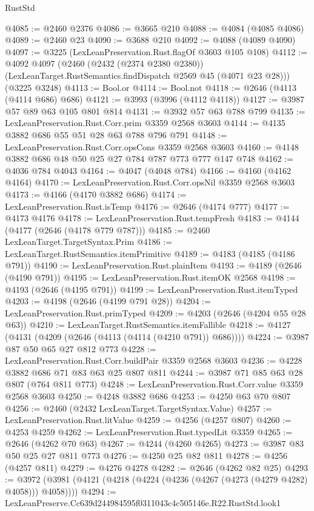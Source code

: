 \begin{lexlean}{RustStd}
\begin{coremodule}
@4085 := @2460 @2376
@4086 := @3665 @210
@4088 := @4084 (@4085 @4086)
@4089 := @2460 @23
@4090 := @3688 @210
@4092 := @4088 (@4089 @4090)
@4097 := @3225 (LexLeanPreservation.Rust.flagOf @3603 @105 @108)
@4112 := @4092
    @4097
    (@2460
      (@2432 (@2374 @2380 @2380))
      (LexLeanTarget.RustSemantics.findDispatch @2569 @45 (@4071 @23 @28)))
    (@3225 @3248)
@4113 := Bool.or
@4114 := Bool.not
@4118 := @2646 (@4113 (@4114 @686) @686)
@4121 := @3993 (@3996 (@4112 @4118))
@4127 := @3987 @57 @89 @63 @105 @801 @814
@4131 := @3932 @57 @63 @788 @799
@4135 := LexLeanPreservation.Rust.Corr.prim @3359 @2568 @3603
@4144 := @4135 @3882 @686 @55 @51 @28 @63 @788 @796 @791
@4148 := LexLeanPreservation.Rust.Corr.opsCons @3359 @2568 @3603
@4160 := @4148 @3882 @686 @48 @50 @25 @27 @784 @787 @773 @777 @147 @748
@4162 := @4036 @784 @4043
@4164 := @4047 (@4048 @784)
@4166 := @4160 (@4162 @4164)
@4170 := LexLeanPreservation.Rust.Corr.opsNil @3359 @2568 @3603
@4173 := @4166 (@4170 @3882 @686)
@4174 := LexLeanPreservation.Rust.isTemp
@4176 := @2646 (@4174 @777)
@4177 := @4173 @4176
@4178 := LexLeanPreservation.Rust.tempFresh
@4183 := @4144 (@4177 (@2646 (@4178 @779 @787)))
@4185 := @2460 LexLeanTarget.TargetSyntax.Prim
@4186 := LexLeanTarget.RustSemantics.itemPrimitive
@4189 := @4183 (@4185 (@4186 @791))
@4190 := LexLeanPreservation.Rust.plainItem
@4193 := @4189 (@2646 (@4190 @791))
@4195 := LexLeanPreservation.Rust.itemOK @2568
@4198 := @4193 (@2646 (@4195 @791))
@4199 := LexLeanPreservation.Rust.itemTyped
@4203 := @4198 (@2646 (@4199 @791 @28))
@4204 := LexLeanPreservation.Rust.primTyped
@4209 := @4203 (@2646 (@4204 @55 @28 @63))
@4210 := LexLeanTarget.RustSemantics.itemFallible
@4218 := @4127 (@4131 (@4209 (@2646 (@4113 (@4114 (@4210 @791)) @686))))
@4224 := @3987 @87 @50 @65 @27 @812 @773
@4228 := LexLeanPreservation.Rust.Corr.buildPair @3359 @2568 @3603
@4236 := @4228 @3882 @686 @71 @83 @63 @25 @807 @811
@4244 := @3987 @71 @85 @63 @28 @807 (@764 @811 @773)
@4248 := LexLeanPreservation.Rust.Corr.value @3359 @2568 @3603
@4250 := @4248 @3882 @686
@4253 := @4250 @63 @70 @807
@4256 := @2460 (@2432 LexLeanTarget.TargetSyntax.Value)
@4257 := LexLeanPreservation.Rust.litValue
@4259 := @4256 (@4257 @807)
@4260 := @4253 @4259
@4262 := LexLeanPreservation.Rust.typedLit @3359
@4265 := @2646 (@4262 @70 @63)
@4267 := @4244 (@4260 @4265)
@4273 := @3987 @83 @50 @25 @27 @811 @773
@4276 := @4250 @25 @82 @811
@4278 := @4256 (@4257 @811)
@4279 := @4276 @4278
@4282 := @2646 (@4262 @82 @25)
@4293 := @3972 (@3981 (@4121 (@4218 (@4224 (@4236 (@4267 (@4273 (@4279 @4282) @4058))) @4058))))
@4294 := LexLeanPreserve.Cc639d244984595f0311043c4c505146e.R22.RustStd.look1

\end{coremodule}
\end{lexlean}
